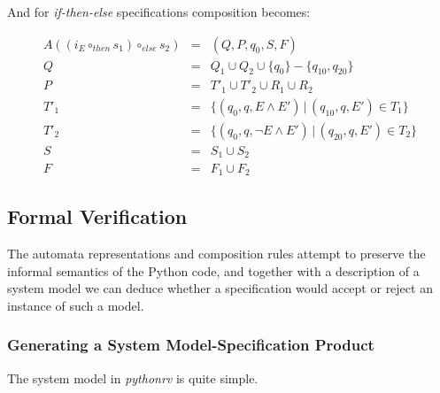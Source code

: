 And for \textit{if-then-else} specifications composition becomes:

\medskip
\[
  \begin{array}{rcl}
  A((i_E \circ_{then} s_1) \circ_{else} s_2) & = & (Q, P, q_0, S, F) \\
                                           Q & = & Q_1 \cup Q_2 \cup \{q_0\} - \{q_{10}, q_{20}\} \\
                                           P & = & T'_1 \cup T'_2 \cup R_1 \cup R_2 \\
                                        T'_1 & = & \{(q_0, q, E       \wedge E') \, | \, (q_{10}, q, E') \in T_1\} \\
                                        T'_2 & = & \{(q_0, q, \neg E \wedge E') \, | \, (q_{20}, q, E') \in T_2\} \\
                                           S & = & S_1 \cup S_2 \\
                                           F & = & F_1 \cup F_2
  \end{array}
\]
\medskip





\subsection{Formal Verification} \label{section-approach-formal-foundation-semantics}

The automata representations and composition rules attempt to preserve the
informal semantics of the Python code, and together with a description of a
system model we can deduce whether a specification would accept or reject an
instance of such a model.


\subsubsection{Generating a System Model-Specification Product}

The system model in \textit{pythonrv} is quite simple.

